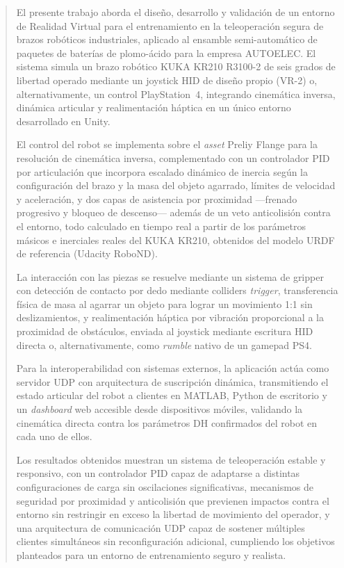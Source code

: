 \documentclass[12pt]{article}
\begin{document}
\renewcommand{\abstractname}{Resumen}

\begin{abstract}

El presente trabajo aborda el diseño, desarrollo y validación de un entorno de Realidad Virtual para el entrenamiento en la teleoperación segura de brazos robóticos industriales, aplicado al ensamble semi-automático de paquetes de baterías de plomo-ácido para la empresa AUTOELEC. El sistema simula un brazo robótico KUKA KR210 R3100-2 de seis grados de libertad operado mediante un joystick HID de diseño propio (VR-2) o, alternativamente, un control PlayStation~4, integrando cinemática inversa, dinámica articular y realimentación háptica en un único entorno desarrollado en Unity.

El control del robot se implementa sobre el \textit{asset} Preliy Flange para la resolución de cinemática inversa, complementado con un controlador PID por articulación que incorpora escalado dinámico de inercia según la configuración del brazo y la masa del objeto agarrado, límites de velocidad y aceleración, y dos capas de asistencia por proximidad ---frenado progresivo y bloqueo de descenso--- además de un veto anticolisión contra el entorno, todo calculado en tiempo real a partir de los parámetros másicos e inerciales reales del KUKA KR210, obtenidos del modelo URDF de referencia (Udacity RoboND).

La interacción con las piezas se resuelve mediante un sistema de gripper con detección de contacto por dedo mediante colliders \textit{trigger}, transferencia física de masa al agarrar un objeto para lograr un movimiento 1:1 sin deslizamientos, y realimentación háptica por vibración proporcional a la proximidad de obstáculos, enviada al joystick mediante escritura HID directa o, alternativamente, como \textit{rumble} nativo de un gamepad PS4.

Para la interoperabilidad con sistemas externos, la aplicación actúa como servidor UDP con arquitectura de suscripción dinámica, transmitiendo el estado articular del robot a clientes en MATLAB, Python de escritorio y un \textit{dashboard} web accesible desde dispositivos móviles, validando la cinemática directa contra los parámetros DH confirmados del robot en cada uno de ellos.

Los resultados obtenidos muestran un sistema de teleoperación estable y responsivo, con un controlador PID capaz de adaptarse a distintas configuraciones de carga sin oscilaciones significativas, mecanismos de seguridad por proximidad y anticolisión que previenen impactos contra el entorno sin restringir en exceso la libertad de movimiento del operador, y una arquitectura de comunicación UDP capaz de sostener múltiples clientes simultáneos sin reconfiguración adicional, cumpliendo los objetivos planteados para un entorno de entrenamiento seguro y realista.

\end{abstract}
\newpage
\end{document}
